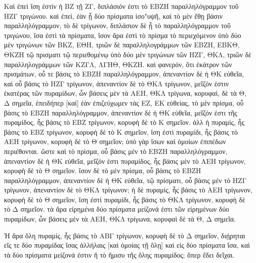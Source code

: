 \begin{Parallel}{}{}
{{\greekfont Καὶ ἐπεὶ ἴση ἐστὶν ἡ ΒΖ τῇ ΖΓ, διπλάσιόν ἐστι τὸ ΕΒΖΗ παραλληλόγραμμον τοῦ ΗΖΓ τριγώνου. καὶ ἐπεὶ, ἐὰν ᾖ δύο πρίσματα
ἰσο"υψῆ, καὶ τὸ μὲν ἔθῃ βάσιν παραλληλόγραμμον, τὸ δὲ τρίγωνον,
διπλάσιον δὲ ᾖ τὸ παραλληλόγραμμον τοῦ τριγώνου, ἴσα ἐστὶ τὰ
πρίσματα, ἴσον ἄρα ἐστὶ τὸ πρίσμα τὸ περιεχόμενον ὑπὸ δύο μὲν
τριγώνων τῶν ΒΚΖ, ΕΘΗ, τριῶν δὲ παραλληλογράμμων τῶν ΕΒΖΗ, ΕΒΚΘ,
ΘΚΖΗ τῷ πρισματι τῷ περιεθομένῳ ὑπὸ δύο μὲν τριγώνων τῶν ΗΖΓ,
ΘΚΛ, τριῶν δὲ παραλληλογράμμων τῶν ΚΖΓΛ, ΛΓΗΘ, ΘΚΖΗ.
καὶ φανερόν, ὅτι ἑκάτρον τῶν πρισμάτων, οὗ τε βάσις τὸ ΕΒΖΗ παραλληλόγραμμον, ἀπεναντίον δὲ ἡ ΘΚ εὐθεῖα, καὶ οὗ βάσις τὸ ΗΖΓ
τρίγωνον, ἀπεναντίον δὲ τὸ ΘΚΛ τρίγωνον, μεῖζόν ἐστιν ἑκατέρας
τῶν πυραμίδων, ὧν βάσεις μὲν τὰ ΑΕΗ, ΘΚΛ τρίγωνα, κορυφαὶ,
δὲ τὰ Θ, Δ σημεῖα, ἐπειδήπερ [καί] ἐὰν ἐπιζεύχωμεν τὰς ΕΖ, ΕΚ
εὐθείας, τὸ μὲν πρίσμα, οὗ βάσις τὸ ΕΒΖΗ παραλληλόγραμμον, 
ἀπεναντίον
δὲ ἡ ΘΚ εὐθεῖα, μεῖζόν ἐστι τῆς πυραμίδος, ἧς βάσις τὸ ΕΒΖ
τρίγωνον, κορυφὴ δὲ τὸ Κ σημεῖον. ἀλλ ἡ πυραμίς, ἧς βάσις τὸ ΕΒΖ
τρίγωνον, κορυφὴ δὲ τὸ Κ σημεῖον, ἴση ἐστὶ πυραμίδι, ἧς βάσις
τὸ ΑΕΗ τρίγωνον, κορυφὴ δὲ τὸ Θ σημεῖον; ὑπὸ γὰρ
ἴσων καὶ ὁμοίων ἐπιπέδων περιέθονται. ὥστε καὶ τὸ πρίσμα,
οὗ βάσις μὲν τὸ ΕΒΖΗ παραλληλόγραμμον, ἀπεναντίον δὲ ἡ ΘΚ εὐθεῖα,
μεῖζόν ἐστι πυραμίδος, ἧς  βάσις μὲν τὸ ΑΕΗ τρίγωνον, κορυφὴ
δὲ τὸ Θ σημεῖον. ἴσον δὲ τὸ μὲν πρίσμα, οὗ βάσις τὸ ΕΒΖΗ παραλληλόγραμμον, ἀπεναντίον δὲ ἡ ΘΚ εὐθεῖα, τῷ πρίσματι, οὗ βάσις
μὲν τὸ ΗΖΓ τρίγωνον, ἀπεναντίον δὲ τὸ ΘΚΛ τρίγωνον; ἡ δὲ πυραμίς,
ἧς βάσις τὸ ΑΕΗ τρίγωνον, κορυφὴ δὲ τὸ Θ σημεῖον, ἴση ἐστὶ πυραμίδι,
ἧς βάσις τὸ ΘΚΛ τρίγωνον, κορυφὴ δὲ τὸ Δ σημεῖον. τὰ ἄρα εἰρημένα
δύο πρίσματα μείζονά ἐστι τῶν εἰρημένων δύο πυραμίδων, ὧν βάσεις
μὲν τὰ ΑΕΗ, ΘΚΛ τρίγωνα, κορυφαὶ δὲ τὰ Θ, Δ σημεῖα.}

{\greekfont Ἡ ἄρα ὅλη πυραμίς, ἧς βάσις τὸ ΑΒΓ τρίγωνον, κορυφὴ δὲ τὸ Δ σημεῖον,
διῄρηται εἴς τε δύο πυραμίδας ἴσας ἀλλήλαις [καὶ ὁμοίας τῇ
ὅλῃ] καὶ εἰς δύο πρίσματα ἴσα, καὶ τὰ δύο πρίσματα μείζονά ἐστιν
ἢ τὸ ἥμισυ τῆς ὅλης πυραμίδος; ὅπερ ἔδει δεῖχαι.}}

\end{Parallel}
